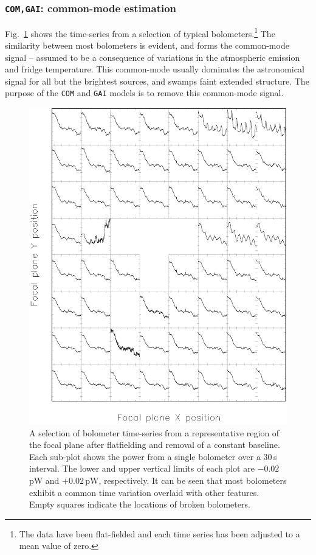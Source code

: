 \documentclass[useAMS,usenatbib,nofootinbib]{mn2e}
\newcommand{\model}[1]{\texttt{#1}}
\begin{document}
\subsubsection{\model{COM,GAI}: common-mode estimation}
\label{sec:comgai}

﻿Fig.~\ref{fig:com} shows the time-series from a selection of typical
bolometers.\footnote{The data have been flat-fielded and each time
series has been adjusted to a mean value of zero.} The similarity
between most bolometers is evident, and forms the common-mode signal
-- assumed to be a consequence of variations in the atmospheric
emission and fridge temperature. This common-mode usually dominates
the astronomical signal for all but the brightest sources, and swamps
faint extended structure.  The purpose of the \model{COM} and
\model{GAI} models is to remove this common-mode signal.

\begin{figure}
\centering
\includegraphics[width=\linewidth]{com}
\caption{A selection of bolometer time-series from a representative
region of the focal plane after flatfielding and removal of a constant
baseline. Each sub-plot shows the power from a single bolometer over a
30\,s interval.  The lower and upper vertical limits of each plot are
$-0.02$\,pW and $+0.02$\,pW, respectively. It can be seen that most
bolometers exhibit a common time variation overlaid with other
features. Empty squares indicate the locations of broken bolometers.}
\label{fig:com}
\end{figure}
\end{document}

